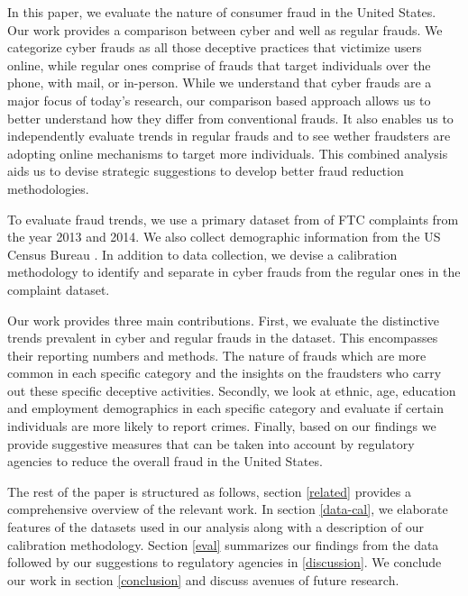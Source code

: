 \documentclass[conference]{IEEEtran}
\begin{document}
In this paper, we evaluate the nature of consumer fraud in the United States. Our work provides a comparison between cyber and well as regular frauds. We categorize cyber frauds as all those deceptive practices that victimize users online, while regular ones comprise of frauds that target individuals over the phone, with mail, or in-person. While we understand that cyber frauds are a major focus of today's research, our comparison based approach allows us to better understand how they differ from conventional frauds. It also enables us to independently evaluate trends in regular frauds and to see wether fraudsters are adopting online mechanisms to target more individuals. This combined analysis aids us to devise strategic suggestions to develop better fraud reduction methodologies.

To evaluate fraud trends, we use a primary dataset from of FTC complaints from the year 2013 and 2014. We also collect demographic information from the US Census Bureau \cite{usbureu}. In addition to data collection, we devise a calibration methodology to identify and separate in cyber frauds from the regular ones in the complaint dataset. 

Our work provides three main contributions. First, we evaluate the distinctive trends prevalent in cyber and regular frauds in the dataset. This encompasses their reporting numbers and methods. The nature of frauds which are more common in each specific category and the insights on the fraudsters who carry out these specific deceptive activities. Secondly, we look at ethnic, age, education and employment demographics in each specific category and evaluate if certain individuals are more likely to report crimes. Finally, based on our findings we provide suggestive measures that can be taken into account by regulatory agencies to reduce the overall fraud in the United States.

The rest of the paper is structured as follows, section \ref{related} provides a comprehensive overview of the relevant work. In section \ref{data-cal}, we elaborate features of the datasets used in our analysis along with a description of our calibration methodology. Section \ref{eval} summarizes our findings from the data followed by our suggestions to regulatory agencies in \ref{discussion}. We conclude our work in section \ref{conclusion} and discuss avenues of future research.
\end{document}
